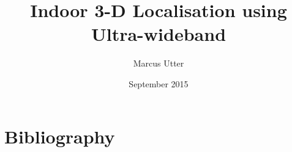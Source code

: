 \documentclass{article}
\title{Indoor 3-D Localisation using Ultra-wideband}
\author{Marcus Utter }
\date{September 2015}
\begin{document}
\maketitle
\clearpage

\tableofcontents
\clearpage






%

%

%

%

\section{Bibliography}


\end{document}

